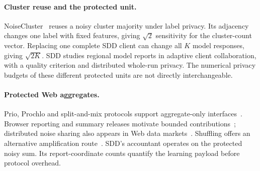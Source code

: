 \paragraph{Cluster reuse and the protected unit.}
NoiseCluster~\cite{tang2022labels} reuses a noisy cluster majority under label
privacy. Its adjacency changes one label with fixed features, giving
$\sqrt2$ sensitivity for the cluster-count vector. Replacing one complete
SDD client can change all $K$ model responses, giving $\sqrt{2K}$.
SDD studies regional model reports in adaptive client collaboration, with a
quality criterion and distributed whole-run privacy. The numerical privacy
budgets of these different protected units are not directly interchangeable.

\paragraph{Protected Web aggregates.}
Prio, Prochlo and split-and-mix protocols support aggregate-only
interfaces~\cite{corriganGibbs2017prio,bittau2017prochlo,ishai2006cryptography}.
Browser reporting and summary releases motivate bounded
contributions~\cite{erlingsson2014rappor,ghazi2025sandbox,aksu2023summary};
distributed noise sharing also appears in Web data markets~\cite{xing2026xemis}.
Shuffling offers an alternative amplification route~\cite{erlingsson2019amplification,feldman2021hiding}.
SDD's accountant operates on the protected noisy sum. Its report-coordinate
counts quantify the learning payload before protocol overhead.

